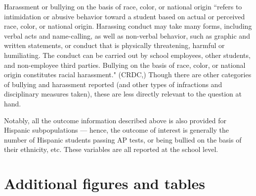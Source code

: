 \documentclass[11pt]{article}
\begin{document}
\begin{itemize}
Harassment or bullying on the basis of race, color, or national origin ``refers to intimidation or abusive behavior toward a student based on actual or perceived race, color, or national origin. Harassing conduct may take many forms, including verbal acts and name-calling, as well as non-verbal behavior, such as graphic and written statements, or conduct that is physically threatening, harmful or humiliating. The conduct can be carried out by school employees, other students, and non-employee third parties. Bullying on the basis of race, color, or national origin constitutes racial harassment." (CRDC,\cite{noauthor_master_2016}) Though there are other categories of bullying and harassment reported (and other types of infractions and disciplinary measures taken), these are less directly relevant to the question at hand.


\end{itemize}

Notably, all the outcome information described above is also provided for Hispanic subpopulations --- hence, the outcome of interest is generally the number of Hispanic students passing AP tests, or being bullied on the basis of their ethnicity, etc. These variables are all reported at the school level. 



\clearpage

\section{Additional figures and tables}











\end{document}
